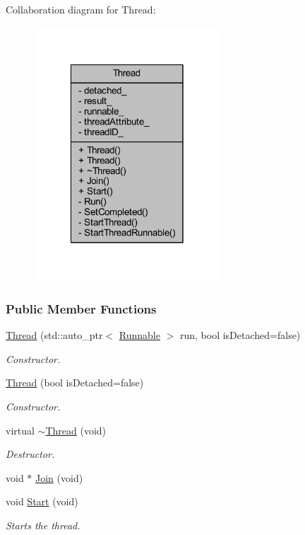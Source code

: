 Collaboration diagram for Thread\-:
\nopagebreak
\begin{figure}[H]
\begin{center}
\leavevmode
\includegraphics[width=198pt]{class_thread__coll__graph}
\end{center}
\end{figure}
\subsubsection*{Public Member Functions}
\begin{DoxyCompactItemize}
\item 
\hyperlink{group___core_a027b9eb38e4d59c076501b305b42f575}{Thread} (std\-::auto\-\_\-ptr$<$ \hyperlink{group___core_class_runnable}{Runnable} $>$ run, bool is\-Detached=false)
\begin{DoxyCompactList}\small\item\em Constructor. \end{DoxyCompactList}\item 
\hyperlink{group___core_a403714feecd93ac10c101a47b7649204}{Thread} (bool is\-Detached=false)
\begin{DoxyCompactList}\small\item\em Constructor. \end{DoxyCompactList}\item 
virtual \hyperlink{group___core_af1e25588ebe47a2a6d79ef8c686a992b}{$\sim$\-Thread} (void)
\begin{DoxyCompactList}\small\item\em Destructor. \end{DoxyCompactList}\item 
void $\ast$ \hyperlink{group___core_a8f33f7750321d5df9188033e7e3e300d}{Join} (void)
\item 
void \hyperlink{group___core_a2b42f82341afd2747ea093b6ac8b91cb}{Start} (void)
\begin{DoxyCompactList}\small\item\em Starts the thread. \end{DoxyCompactList}\end{DoxyCompactItemize}
